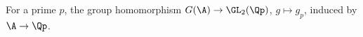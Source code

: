 For a prime $p$, the group homomorphism $G(\A)\to\GL_2(\Qp)$, $g\mapsto g_p$, induced by $\A\to\Qp$.

